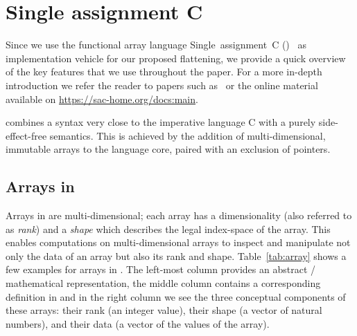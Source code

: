 
\section{Single assignment C}\label{sec:sac}

Since we use the functional array language Single~assignment~C (\sac{})~\cite{sac,sac2} as implementation vehicle for our proposed flattening,
we provide a quick overview of the key features that we use throughout the paper.
For a more in-depth introduction we refer the reader to papers such as~\cite{sac,sac2} or the online material available on \url{https://sac-home.org/docs:main}.

\sac{} combines a syntax very close to the imperative language C with a purely
side-effect-free semantics. This is achieved by the addition of multi-dimensional, immutable arrays to the language core, paired with an exclusion of pointers.

\subsection{Arrays in \sac{}}

Arrays in \sac{} are multi-dimensional; each array has a dimensionality (also referred to as \textit{rank}) and a \textit{shape} which describes the legal index-space of the array.
This enables computations on multi-dimensional arrays to inspect and 
manipulate not only the data of an array but also its rank and shape.
Table~\ref{tab:array} shows a few examples for arrays in \sac{}. The left-most column provides
an abstract / mathematical representation, the middle column contains a corresponding definition in \sac{} and in the right column we see the three conceptual components of these arrays: their rank (an integer value), their shape (a vector of natural numbers), and their data (a vector of the values of the array). 

